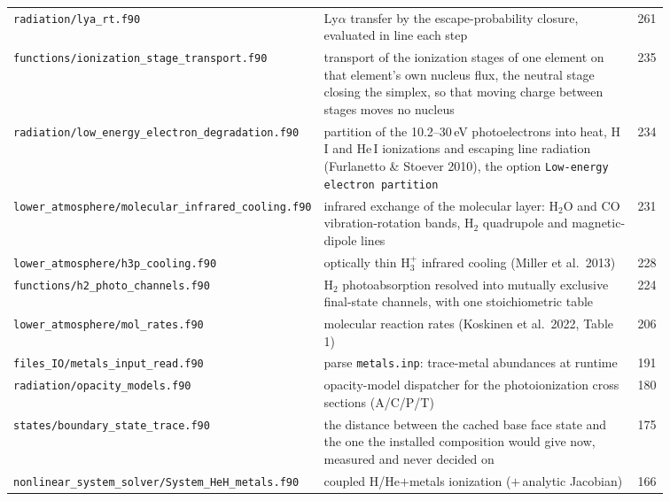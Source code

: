 {\begin{longtable}{@{}>{\raggedright\arraybackslash}p{0.36\linewidth} >{\raggedright\arraybackslash}p{0.50\linewidth} r@{}}
\texttt{radiation/\allowbreak lya\_\allowbreak rt.f90} & Ly$\alpha$ transfer by the escape-probability closure, evaluated in line each step & 261 \\
\texttt{functions/\allowbreak ionization\_\allowbreak stage\_\allowbreak transport.f90} & transport of the ionization stages of one element on that element's own nucleus flux, the neutral stage closing the simplex, so that moving charge between stages moves no nucleus & 235 \\
\texttt{radiation/\allowbreak low\_\allowbreak energy\_\allowbreak electron\_\allowbreak degradation.f90} & partition of the 10.2--30\,eV photoelectrons into heat, H\,I and He\,I ionizations and escaping line radiation (Furlanetto \& Stoever 2010), the option \texttt{Low-energy electron partition} & 234 \\
\texttt{lower\_\allowbreak atmosphere/\allowbreak molecular\_\allowbreak infrared\_\allowbreak cooling.f90} & infrared exchange of the molecular layer: H$_2$O and CO vibration-rotation bands, H$_2$ quadrupole and magnetic-dipole lines & 231 \\
\texttt{lower\_\allowbreak atmosphere/\allowbreak h3p\_\allowbreak cooling.f90} & optically thin H$_3^+$ infrared cooling (Miller et al.\ 2013) & 228 \\
\texttt{functions/\allowbreak h2\_\allowbreak photo\_\allowbreak channels.f90} & H$_2$ photoabsorption resolved into mutually exclusive final-state channels, with one stoichiometric table & 224 \\
\texttt{lower\_\allowbreak atmosphere/\allowbreak mol\_\allowbreak rates.f90} & molecular reaction rates (Koskinen et al.\ 2022, Table 1) & 206 \\
\texttt{files\_\allowbreak IO/\allowbreak metals\_\allowbreak input\_\allowbreak read.f90} & parse \texttt{metals.inp}: trace-metal abundances at runtime & 191 \\
\texttt{radiation/\allowbreak opacity\_\allowbreak models.f90} & opacity-model dispatcher for the photoionization cross sections (A/C/P/T) & 180 \\
\texttt{states/\allowbreak boundary\_\allowbreak state\_\allowbreak trace.f90} & the distance between the cached base face state and the one the installed composition would give now, measured and never decided on & 175 \\
\texttt{nonlinear\_\allowbreak system\_\allowbreak solver/\allowbreak System\_\allowbreak HeH\_\allowbreak metals.f90} & coupled H/He$+$metals ionization ($+$\,analytic Jacobian) & 166 \\

\end{longtable}}
